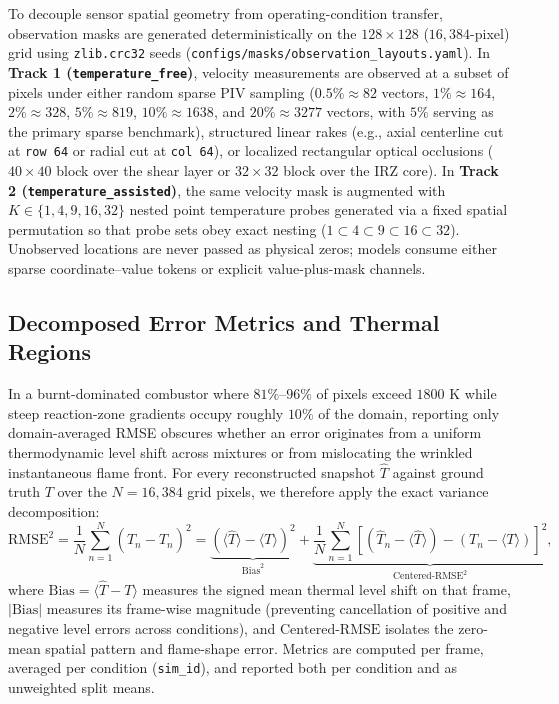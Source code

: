 To decouple sensor spatial geometry from operating-condition transfer, observation masks are generated deterministically on the $128 \times 128$ ($16{,}384$-pixel) grid using \texttt{zlib.crc32} seeds (\texttt{configs/masks/observation\_layouts.yaml}). In \textbf{Track 1 (\texttt{temperature\_free})}, velocity measurements are observed at a subset of pixels under either random sparse PIV sampling ($0.5\% \approx 82$ vectors, $1\% \approx 164$, $2\% \approx 328$, $5\% \approx 819$, $10\% \approx 1638$, and $20\% \approx 3277$ vectors, with $5\%$ serving as the primary sparse benchmark), structured linear rakes (e.g., axial centerline cut at \texttt{row 64} or radial cut at \texttt{col 64}), or localized rectangular optical occlusions ($40 \times 40$ block over the shear layer or $32 \times 32$ block over the IRZ core). In \textbf{Track 2 (\texttt{temperature\_assisted})}, the same velocity mask is augmented with $K \in \{1, 4, 9, 16, 32\}$ nested point temperature probes generated via a fixed spatial permutation so that probe sets obey exact nesting ($1 \subset 4 \subset 9 \subset 16 \subset 32$). Unobserved locations are never passed as physical zeros; models consume either sparse coordinate--value tokens or explicit value-plus-mask channels.

\subsection{Decomposed Error Metrics and Thermal Regions}
\label{subsec:data_metrics}

In a burnt-dominated combustor where $81\%\text{--}96\%$ of pixels exceed $1800\text{ K}$ while steep reaction-zone gradients occupy roughly $10\%$ of the domain, reporting only domain-averaged RMSE obscures whether an error originates from a uniform thermodynamic level shift across mixtures or from mislocating the wrinkled instantaneous flame front. For every reconstructed snapshot $\hat{T}$ against ground truth $T$ over the $N = 16{,}384$ grid pixels, we therefore apply the exact variance decomposition:
\begin{equation}
    \text{RMSE}^2 = \frac{1}{N}\sum_{n=1}^{N} (\hat{T}_n - T_n)^2 = \underbrace{\left(\langle\hat{T}\rangle - \langle T\rangle\right)^2}_{\text{Bias}^2} + \underbrace{\frac{1}{N}\sum_{n=1}^{N} \left[(\hat{T}_n - \langle\hat{T}\rangle) - (T_n - \langle T\rangle)\right]^2}_{\text{Centered-RMSE}^2},
    \label{eq:data_rmse_decomp}
\end{equation}
where $\text{Bias} = \langle\hat{T} - T\rangle$ measures the signed mean thermal level shift on that frame, $|\text{Bias}|$ measures its frame-wise magnitude (preventing cancellation of positive and negative level errors across conditions), and $\text{Centered-RMSE}$ isolates the zero-mean spatial pattern and flame-shape error. Metrics are computed per frame, averaged per condition (\texttt{sim\_id}), and reported both per condition and as unweighted split means.


